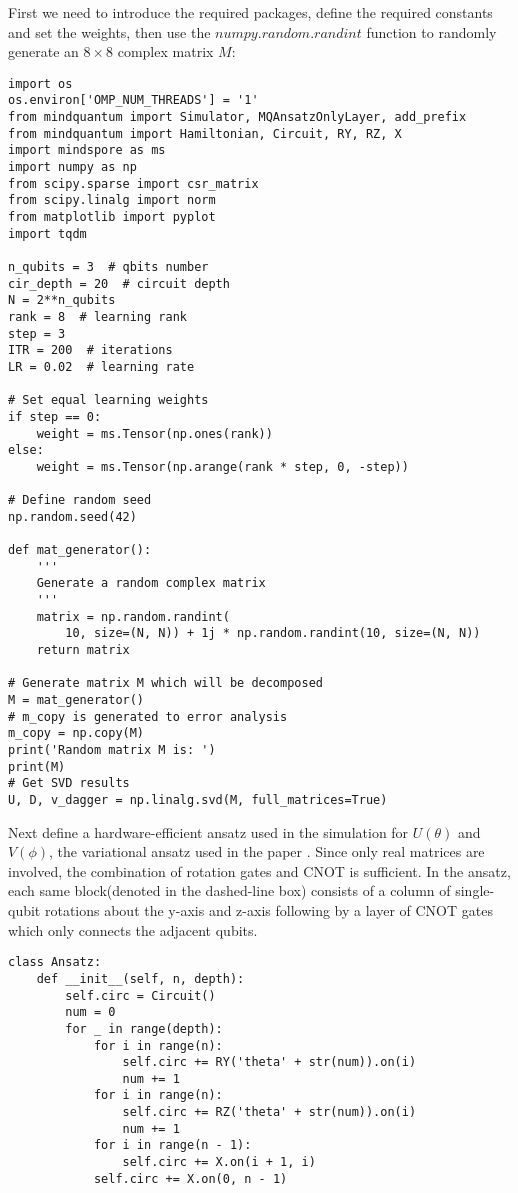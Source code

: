 First we need to introduce the required packages, define the required constants and set the weights, then use the $numpy.random.randint$ function to randomly generate an $8 \times 8$ complex matrix $M$:
\begin{lstlisting}
import os
os.environ['OMP_NUM_THREADS'] = '1'
from mindquantum import Simulator, MQAnsatzOnlyLayer, add_prefix
from mindquantum import Hamiltonian, Circuit, RY, RZ, X
import mindspore as ms
import numpy as np
from scipy.sparse import csr_matrix
from scipy.linalg import norm
from matplotlib import pyplot
import tqdm

n_qubits = 3  # qbits number
cir_depth = 20  # circuit depth
N = 2**n_qubits
rank = 8  # learning rank
step = 3
ITR = 200  # iterations
LR = 0.02  # learning rate

# Set equal learning weights
if step == 0:
    weight = ms.Tensor(np.ones(rank))
else:
    weight = ms.Tensor(np.arange(rank * step, 0, -step))

# Define random seed
np.random.seed(42)

def mat_generator():
    '''
    Generate a random complex matrix
    '''
    matrix = np.random.randint(
        10, size=(N, N)) + 1j * np.random.randint(10, size=(N, N))
    return matrix

# Generate matrix M which will be decomposed
M = mat_generator()
# m_copy is generated to error analysis
m_copy = np.copy(M)
print('Random matrix M is: ')
print(M)
# Get SVD results
U, D, v_dagger = np.linalg.svd(M, full_matrices=True)
\end{lstlisting}
Next define a hardware-efficient ansatz used in the simulation for $U(\theta)$ and $V(\phi)$, the variational ansatz used in the paper \cite{wang2021variational}. Since only real matrices are involved, the combination of rotation gates and CNOT is sufficient. In the ansatz, each same block(denoted in the dashed-line box) consists of a column of single-qubit rotations about the y-axis and z-axis following by a layer of CNOT gates which only connects the adjacent qubits. 
\begin{lstlisting}
class Ansatz:
    def __init__(self, n, depth):
        self.circ = Circuit()
        num = 0
        for _ in range(depth):
            for i in range(n):
                self.circ += RY('theta' + str(num)).on(i)
                num += 1
            for i in range(n):
                self.circ += RZ('theta' + str(num)).on(i)
                num += 1
            for i in range(n - 1):
                self.circ += X.on(i + 1, i)
            self.circ += X.on(0, n - 1)
\end{lstlisting}
